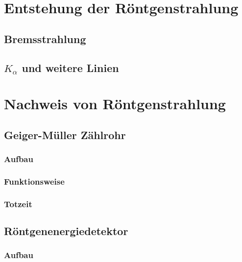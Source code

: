 \section{Entstehung der Röntgenstrahlung}

\parencite[Abschnitt~17.3.1]{meschede-gerthsen_24}

\subsection{Bremsstrahlung}

\parencite[Abschnitt~17.3.4]{meschede-gerthsen_24}

\subsection{$K_\alpha$ und weitere Linien}

\parencite[Abschnitt~17.3.5]{meschede-gerthsen_24}

\section{Nachweis von Röntgenstrahlung}

\subsection{Geiger-Müller Zählrohr}

\parencite[Abschnitt~9.3.2]{meschede-gerthsen_24}

\parencite[Abschnitt~19.3.2~d)]{meschede-gerthsen_24}

\subsubsection{Aufbau}

\subsubsection{Funktionsweise}

\subsubsection{Totzeit}

\subsection{Röntgenenergiedetektor}

\subsubsection{Aufbau}

